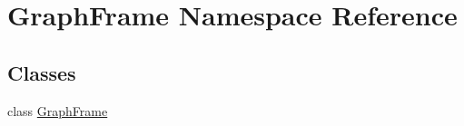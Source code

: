 \hypertarget{namespaceGraphFrame}{}\section{Graph\+Frame Namespace Reference}
\label{namespaceGraphFrame}
\subsection*{Classes}
\begin{DoxyCompactItemize}
\item 
class \hyperlink{classGraphFrame_1_1GraphFrame}{Graph\+Frame}
\end{DoxyCompactItemize}
